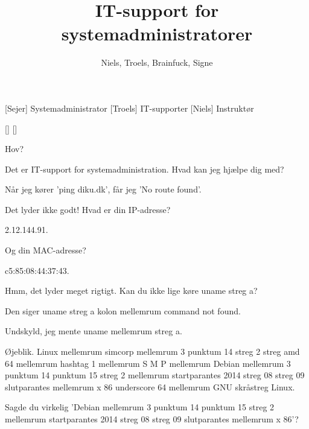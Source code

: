 \documentclass[a4paper,11pt]{article}
\title{IT-support for systemadministratorer}
\author{Niels, Troels, Brainfuck, Signe}
\begin{document}
\maketitle

\begin{roles}
[Sejer] Systemadministrator
[Troels] IT-supporter
[Niels] Instruktør
\end{roles}

\begin{props}
\end{props}

\begin{sketch}



 Hov?


 Det er IT-support for systemadministration.  Hvad kan jeg hjælpe dig
med?

 Når jeg kører 'ping diku.dk', får jeg 'No route found'.

 Det lyder ikke godt!  Hvad er din IP-adresse?

 2.12.144.91.

 Og din MAC-adresse?

 c5:85:08:44:37:43.

 Hmm, det lyder meget rigtigt.  Kan du ikke lige køre uname streg a?

 Den siger uname streg a kolon mellemrum command not found.

 Undskyld, jeg mente uname mellemrum streg a.

 Øjeblik.  Linux mellemrum simcorp mellemrum 3 punktum
14 streg 2 streg amd 64 mellemrum hashtag 1 mellemrum S M P mellemrum Debian
mellemrum 3 punktum 14 punktum 15 streg 2 mellemrum startparantes 2014 streg 08
streg 09 slutparantes mellemrum x 86 underscore 64 mellemrum GNU skråstreg
Linux.


 Sagde du virkelig 'Debian mellemrum 3 punktum 14 punktum 15 streg 2
mellemrum startparantes 2014 streg 08 streg 09 slutparantes mellemrum x 86'?


\end{sketch}
\end{document}
